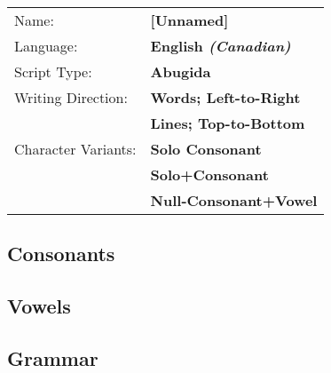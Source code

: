 \label{AbR}
\newpage

\begin{tabular}{@{}l l@{}}
Name:               & \textbf{[Unnamed]}\\
Language:           & \textbf{English \emph{(Canadian)}}\\
Script Type:        & \textbf{Abugida}\\
Writing Direction:  & \textbf{Words; Left-to-Right}\\
                    & \textbf{Lines; Top-to-Bottom}\\
Character Variants: & \textbf{Solo Consonant}\\
                    & \textbf{Solo+Consonant}\\
                    & \textbf{\gls{Null-Consonant}+Vowel}
\end{tabular}


\newpage
\subsection{Consonants}


\newpage
\subsection{Vowels}


\newpage
\subsection{Grammar}
